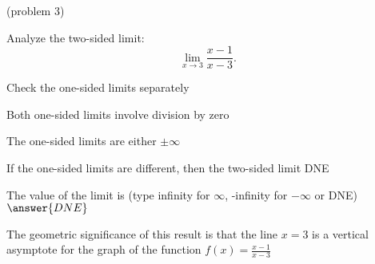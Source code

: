 \documentclass[handout]{ximera}
\begin{document}
\begin{problem}(problem 3)
  
	Analyze the two-sided limit:
  \[
  \lim_{x \to 3} \frac{x-1}{x-3}.
  \]
  
    \begin{hint}
      Check the one-sided limits separately
    \end{hint}
    \begin{hint}
      Both one-sided limits involve division by zero
    \end{hint}
    \begin{hint}
      The one-sided limits are either $\pm \infty$
    \end{hint}
		\begin{hint}
		  If the one-sided limits are different, then the two-sided limit DNE
		\end{hint}	
		The value of the limit is
		(type infinity for $\infty$, -infinity for $-\infty$ or DNE)
		 $\answer{DNE}$
		
		The geometric significance of this result is that the line $x=3$  
is a vertical asymptote for the graph of the function $f(x) = \frac{x-1}{x-3}$
\end{problem}
\end{document}

